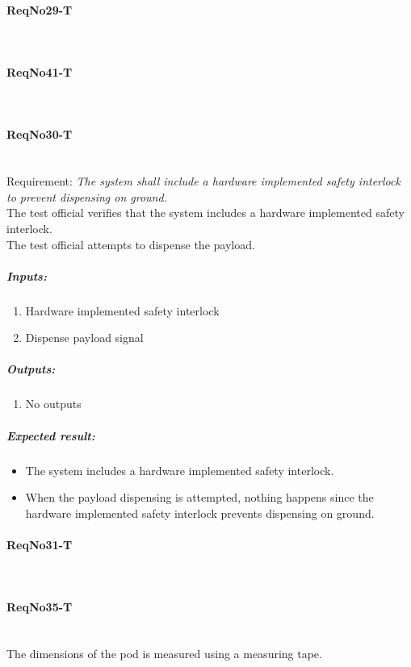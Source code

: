 \paragraph{ReqNo29-T}\mbox{}\\ %


\paragraph{ReqNo41-T}\mbox{}\\ %

\paragraph{ReqNo30-T}\mbox{}\\ %
Requirement: \textit{The system shall include a hardware implemented safety interlock to prevent dispensing on ground.}\\

The test official verifies that the system includes a hardware implemented safety interlock. \\
The test official attempts to dispense the payload.  
\subparagraph{Inputs:}
	\begin{enumerate}
	\item Hardware implemented safety interlock
	\item Dispense payload signal
	\end{enumerate}
\subparagraph{Outputs:}
	\begin{enumerate}
	\item No outputs
	\end{enumerate}
\subparagraph{Expected result:}
	\begin{itemize}
	\item The system includes a hardware implemented safety interlock.
	\item When the payload dispensing is attempted, nothing happens since the hardware implemented safety interlock prevents dispensing on ground.
	\end{itemize}

\paragraph{ReqNo31-T}\mbox{}\\ %

\paragraph{ReqNo35-T}\mbox{}\\ %
The dimensions of the pod is measured using a measuring tape.

